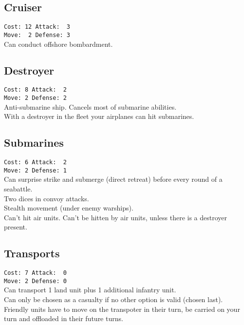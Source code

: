 \documentclass[10pt,twoside]{article}
\begin{document}
\begin{multicols*}{3}
\subsection*{Cruiser}
\texttt{Cost: 12 \quad\quad\quad Attack: ~3 \\ Move: ~2 \quad\quad\quad Defense: 3 \\ }
Can conduct offshore bombardment.

\subsection*{Destroyer}
\texttt{Cost: 8 \quad\quad\quad Attack: ~2 \\ Move: 2 \quad\quad\quad Defense: 2 \\ }
Anti-submarine ship. Cancels most of submarine abilities.\\
With a destroyer in the fleet your airplanes can hit submarines.

\subsection*{Submarines}
\texttt{Cost: 6 \quad\quad\quad Attack: ~2 \\ Move: 2 \quad\quad\quad Defense: 1 \\ }
Can surprise strike and submerge (direct retreat) before every round of a seabattle.\\
Two dices in convoy attacks.\\
Stealth movement (under enemy warships).\\
Can't hit air units. Can't be hitten by air units, unless there is a destroyer present.

\subsection*{Transports}
\texttt{Cost: 7 \quad\quad\quad Attack: ~0 \\ Move: 2 \quad\quad\quad Defense: 0 \\ }
Can transport 1 land unit plus 1 additional infantry unit.\\
Can only be chosen as a casualty if no other option is valid (\glqq chosen last\grqq).\\
Friendly units have to move on the transpoter in their turn, be carried on your turn and offloaded in their future turns.


\end{multicols*}
\end{document}
